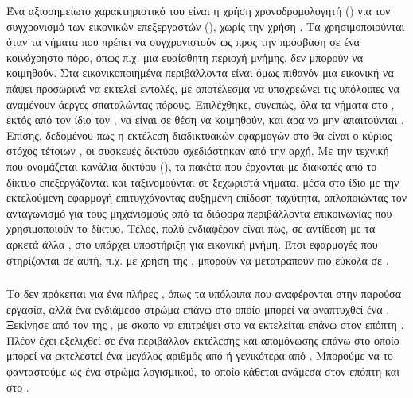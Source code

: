 Ένα αξιοσημείωτο χαρακτηριστικό του είναι η χρήση
χρονοδρομολογητή () για τον συγχρονισμό
των εικονικών επεξεργαστών (), χωρίς την
χρήση . Tα  χρησιμοποιούνται όταν
τα νήματα που πρέπει να συγχρονιστούν ως προς την
πρόσβαση σε ένα κοινόχρηστο πόρο, όπως π.χ. μια ευαίσθητη
περιοχή μνήμης, δεν μπορούν να κοιμηθούν. Στα
εικονικοποιημένα περιβάλλοντα είναι όμως πιθανόν
μια εικονική  να πάψει προσωρινά να εκτελεί
εντολές, με αποτέλεσμα να υποχρεώνει τις υπόλοιπες
να αναμένουν άεργες σπαταλώντας πόρους. Επιλέχθηκε,
συνεπώς, όλα τα νήματα στο , εκτός από τον ίδιο τον ,
να είναι σε θέση να κοιμηθούν, και άρα να μην απαιτούνται
\cite{OSV-optimizing}. Επίσης, δεδομένου πως η εκτέλεση διαδικτυακών
εφαρμογών στο  θα είναι ο κύριος στόχος τέτοιων ,
οι συσκευές δικτύου σχεδιάστηκαν από την αρχή. Με την
τεχνική που ονομάζεται κανάλια δικτύου (),
τα πακέτα που έρχονται με διακοπές από το δίκτυο
επεξεργάζονται και ταξινομούνται σε ξεχωριστά νήματα,
μέσα στο ίδιο  με την εκτελούμενη εφαρμογή
επιτυγχάνοντας αυξημένη επίδοση ταχύτητα, απλοποιώντας
τον ανταγωνισμό για τους μηχανισμούς από τα διάφορα περιβάλλοντα επικοινωνίας
που χρησιμοποιούν το δίκτυο. Τέλος, πολύ ενδιαφέρον είναι
πως, σε αντίθεση με τα αρκετά άλλα ,
στο  υπάρχει υποστήριξη για εικονική μνήμη. Έτσι
εφαρμογές που στηρίζονται σε αυτή, π.χ. με χρήση της
, μπορούν να μετατραπούν πιο εύκολα σε \cite{OSV-optimizing}.

\subsubsection{}

Το  δεν πρόκειται για ένα πλήρες , όπως
τα υπόλοιπα που αναφέρονται στην παρούσα εργασία, αλλά ένα ενδιάμεσο
στρώμα επάνω στο οποίο μπορεί να αναπτυχθεί ένα .
Ξεκίνησε από τον  της , με σκοπο να
επιτρέψει στο  να εκτελείται επάνω στον επόπτη .
Πλέον έχει εξελιχθεί σε ένα  περιβάλλον εκτέλεσης και
απομόνωσης επάνω στο οποίο μπορεί να εκτελεστεί ένα μεγάλος
αριθμός από  ή γενικότερα από .
Μπορούμε να το φανταστούμε ως ένα στρώμα λογισμικού, το οποίο
κάθεται ανάμεσα στον επόπτη και στο \cite{solo5}.
\newline

